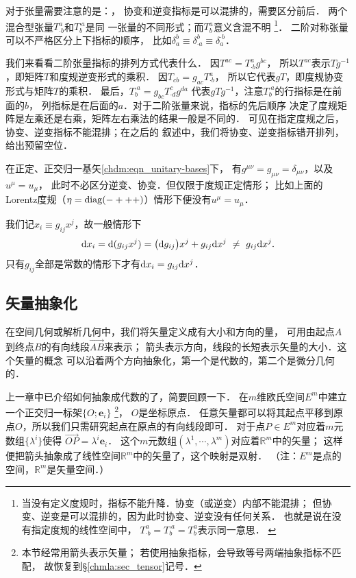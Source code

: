 对于张量需要注意的是：{\kaishu{}}，
协变和逆变指标是{\heiti{}}可以混排的，需要区分前后．
两个混合型张量$T^{a}_{\cdot b}$和$T^{\cdot a}_{b}$是同
一张量的不同形式；而$T^{a}_{b}$意义含混不明
{\footnote{当没有定义度规时，指标不能升降．协变（或逆变）内部不能混排；
        但协变、逆变是可以混排的，因为此时协变、逆变没有任何关系．
        也就是说在没有指定度规的线性空间中，
        $T^{a}_{\cdot b}=T^{\cdot a}_{b}=T^{a}_{b}$表示同一意思．
        \label{chdm:ft_index}}}．
二阶{\kaishu 对称}张量可以不严格区分上下指标的顺序，
比如$\delta_{a}^{b}\equiv \delta_{\cdot a}^{b}\equiv \delta_{a}^{\cdot b}$．

我们来看看二阶张量指标的排列方式代表什么．
因$T^{ac}=T^{a}_{\cdot b}g^{bc}$，
所以$T^{ac}$表示$Tg^{-1}$，即矩阵$T$和度规逆变形式的乘积．
因$T_{cb}=g_{ac}T^{a}_{\cdot b}$，
所以它代表$g T$，即度规协变形式与矩阵$T$的乘积．
最后，$T^{\cdot a}_{b}=g_{bc}T^{c}_{\cdot d}g^{da}$
代表$g T g^{-1}$，注意$T^{\cdot a}_{b}$的行指标是在前面的$b$，
列指标是在后面的$a$．对于二阶张量来说，指标的先后顺序
决定了度规矩阵是左乘还是右乘，矩阵左右乘法的结果一般是不同的．
可见在指定度规之后，协变、逆变指标不能混排；在之后的
叙述中，我们将协变、逆变指标错开排列，给出预留空位．

在{\kaishu 正定、正交归一}基矢\eqref{chdm:eqn_unitary-bases}下，
有$g^{\mu\nu}=g_{\mu\nu}=\delta_{\mu\nu}$，以及$u^\mu = u_\mu$，
此时不必区分逆变、协变．但仅限于度规正定情形；
比如上面的Lorentz度规（$\eta={\rm diag}(-+++)$）情形下便没有$u^\mu = u_\mu$．

我们记$x_i \equiv g_{ij}x^j$，故一般情形下
\begin{align}
	{\rm d}x_i = {\rm d}(g_{ij}x^j) = \bigl({\rm d}g_{ij}\bigr)x^j+ g_{ij}{\rm d}x^j
	\  \neq \ g_{ij}{\rm d}x^j.
\end{align}
只有$g_{ij}$全部是常数的情形下才有${\rm d}x_i =g_{ij}{\rm d}x^j$．



\subsection{矢量抽象化}\label{chdm:sec_vector-abstract2geo}
在空间几何或解析几何中，我们将矢量定义成有大小和方向的量，
可用由起点$A$到终点$B$的有向线段$\overrightarrow{AB}$来表示；
箭头表示方向，线段的长短表示矢量的大小．这个矢量的概念
可以沿着两个方向{\kaishu 抽象化}，第一个是代数的，第二个是微分几何的．

上一章中已介绍如何抽象成代数的了，简要回顾一下．
在$m$维欧氏空间$E^m$中建立一个正交归一标架$\{O;\boldsymbol{e}_i\}$
{\footnote{本节经常用箭头表示矢量；
        若使用抽象指标，会导致等号两端抽象指标不匹配，
    故恢复到\S\ref{chmla:sec_tensor}记号．}}，
$O$是坐标原点．
任意矢量都可以将其起点平移到原点$O$，所以我们只需研究起点在原点的有向线段即可．
对于点$P \in E^m$对应着$m$元数组$\{\lambda^i\}$使得
$    \overrightarrow{OP} = \lambda^i \boldsymbol{e}_i $．
这个$m$元数组$(\lambda^1,\cdots,\lambda^m)$对应着$\mathbb{R}^m$中的矢量；
这样便把箭头抽象成了线性空间$\mathbb{R}^m$中的矢量了，这个映射是双射．
（注：$E^m$是{\kaishu 点}的空间，$\mathbb{R}^m$是{\kaishu 矢量}空间．）

